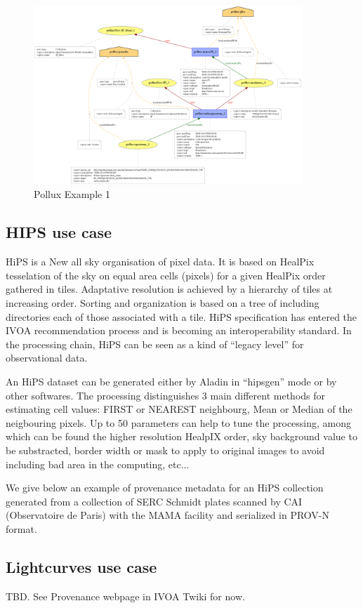 \begin{figure}
\centering
\includegraphics[width=0.9\textwidth]{usecase_Pollux_example1.png}
\caption{Pollux Example 1}
\label{fig:pollux}
\end{figure}

\subsection{HIPS use case}
HiPS is a New all sky organisation of pixel data. It is based on HealPix tesselation of the sky on equal area cells (pixels) for a given HealPix order  gathered in tiles. Adaptative resolution is achieved by a hierarchy of tiles at increasing order. Sorting and organization is based on a tree of including directories each of those associated with a tile. HiPS specification has entered the IVOA recommendation process and is becoming an interoperability standard.
In the processing chain, HiPS can be seen as a kind of ``legacy level'' for observational data.

An HiPS dataset can be generated either by Aladin in ``hipsgen'' mode or by other softwares.  The processing distinguishes 3 main different methods for estimating cell values: FIRST or NEAREST neighbourg, Mean or Median of the neigbouring pixels. Up to 50 parameters can help to tune the processing, among which can be found the higher resolution HealpIX order, sky background value to be substracted, border width or mask to apply to original images to avoid including bad area in the computing, etc...

We give below an example of provenance metadata for an HiPS collection generated from a collection of SERC Schmidt plates scanned by CAI (Observatoire de Paris) with the MAMA facility and serialized in PROV-N format.
 
\subsection{Lightcurves use case}
TBD. See Provenance webpage in IVOA Twiki for now.
